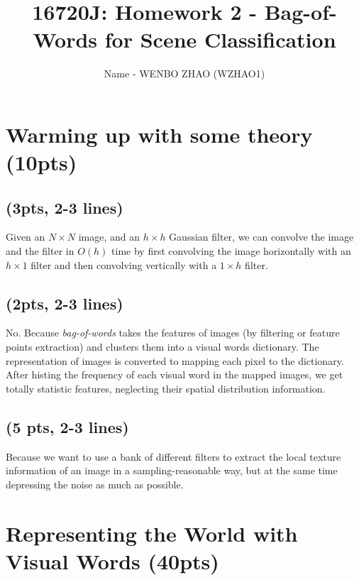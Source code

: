 \documentclass[12pt]{article}
\begin{document}
\title{16720J: Homework 2 - Bag-of-Words for Scene Classification}

\author{Name - WENBO ZHAO (WZHAO1)}

\maketitle

\setcounter{section}{2}

\section{Warming up with some theory (10pts)}

\renewcommand{\thesubsection}{\bf Question \arabic{section}.\arabic{subsection}}

\subsection{(3pts, 2-3 lines)}

Given an $N \times N$ image, and an $h \times h$ Gaussian filter, we can convolve the image and the filter in $O(h)$
time by first convolving the image horizontally with an $h \times 1$ filter and then convolving vertically with a $1 \times h$ filter.  


\subsection{(2pts, 2-3 lines)}
\label{sub:bag-of-words}
No. Because \emph{bag-of-words} takes the features of images (by filtering or feature points extraction) and clusters them into a visual words dictionary. The representation of images is converted to mapping each pixel to the dictionary. After histing the frequency of each visual word in the mapped images, we get totally statistic features, neglecting their spatial distribution information.

\subsection{(5 pts, 2-3 lines)}

Because we want to use a bank of different filters to extract the local texture information of an image in a sampling-reasonable way, but at the same time depressing the noise as much as possible. 

\section{Representing the World with Visual Words (40pts)}
\label{repviswords}
\end{document}
